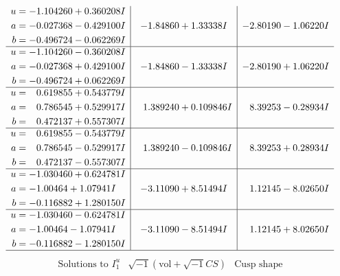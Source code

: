 \documentclass[1p]{elsarticle_modified}
\theoremstyle{definition}
\newcommand{\I}{\sqrt{-1}}
\begin{document}
$$\begin{array}{c|c|c}
\begin{aligned}
u &= -1.104260 + 0.360208 I \\
a &= -0.027368 - 0.429100 I \\
b &= -0.496724 - 0.062269 I\end{aligned}
 & -1.84860 + 1.33338 I & -2.80190 - 1.06220 I \\ \hline\begin{aligned}
u &= -1.104260 - 0.360208 I \\
a &= -0.027368 + 0.429100 I \\
b &= -0.496724 + 0.062269 I\end{aligned}
 & -1.84860 - 1.33338 I & -2.80190 + 1.06220 I \\ \hline\begin{aligned}
u &= \phantom{-}0.619855 + 0.543779 I \\
a &= \phantom{-}0.786545 + 0.529917 I \\
b &= \phantom{-}0.472137 + 0.557307 I\end{aligned}
 & \phantom{-}1.389240 + 0.109846 I & \phantom{-}8.39253 - 0.28934 I \\ \hline\begin{aligned}
u &= \phantom{-}0.619855 - 0.543779 I \\
a &= \phantom{-}0.786545 - 0.529917 I \\
b &= \phantom{-}0.472137 - 0.557307 I\end{aligned}
 & \phantom{-}1.389240 - 0.109846 I & \phantom{-}8.39253 + 0.28934 I \\ \hline\begin{aligned}
u &= -1.030460 + 0.624781 I \\
a &= -1.00464 + 1.07941 I \\
b &= -0.116882 + 1.280150 I\end{aligned}
 & -3.11090 + 8.51494 I & \phantom{-}1.12145 - 8.02650 I \\ \hline\begin{aligned}
u &= -1.030460 - 0.624781 I \\
a &= -1.00464 - 1.07941 I \\
b &= -0.116882 - 1.280150 I\end{aligned}
 & -3.11090 - 8.51494 I & \phantom{-}1.12145 + 8.02650 I\\
 \hline 
 \end{array}$$\newpage$$\begin{array}{c|c|c}  
\text{Solutions to }I^u_{1}& \I (\text{vol} + \sqrt{-1}CS) & \text{Cusp shape}\\
 \hline 
\begin{aligned}

\end{aligned}
\end{array}$$
\end{document}
